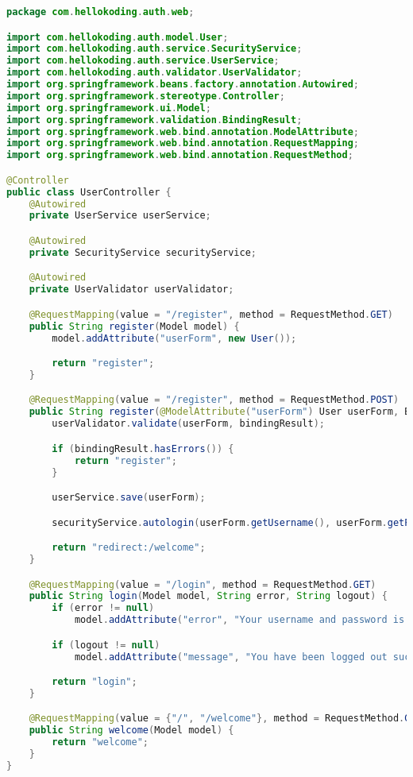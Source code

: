 \begin{lstlisting}[language = Java]
package com.hellokoding.auth.web;

import com.hellokoding.auth.model.User;
import com.hellokoding.auth.service.SecurityService;
import com.hellokoding.auth.service.UserService;
import com.hellokoding.auth.validator.UserValidator;
import org.springframework.beans.factory.annotation.Autowired;
import org.springframework.stereotype.Controller;
import org.springframework.ui.Model;
import org.springframework.validation.BindingResult;
import org.springframework.web.bind.annotation.ModelAttribute;
import org.springframework.web.bind.annotation.RequestMapping;
import org.springframework.web.bind.annotation.RequestMethod;

@Controller
public class UserController {
    @Autowired
    private UserService userService;

    @Autowired
    private SecurityService securityService;

    @Autowired
    private UserValidator userValidator;

    @RequestMapping(value = "/register", method = RequestMethod.GET)
    public String register(Model model) {
        model.addAttribute("userForm", new User());

        return "register";
    }

    @RequestMapping(value = "/register", method = RequestMethod.POST)
    public String register(@ModelAttribute("userForm") User userForm, BindingResult bindingResult, Model model) {
        userValidator.validate(userForm, bindingResult);

        if (bindingResult.hasErrors()) {
            return "register";
        }

        userService.save(userForm);

        securityService.autologin(userForm.getUsername(), userForm.getPasswordConfirm());

        return "redirect:/welcome";
    }

    @RequestMapping(value = "/login", method = RequestMethod.GET)
    public String login(Model model, String error, String logout) {
        if (error != null)
            model.addAttribute("error", "Your username and password is invalid.");

        if (logout != null)
            model.addAttribute("message", "You have been logged out successfully.");

        return "login";
    }

    @RequestMapping(value = {"/", "/welcome"}, method = RequestMethod.GET)
    public String welcome(Model model) {
        return "welcome";
    }
}
\end{lstlisting}

